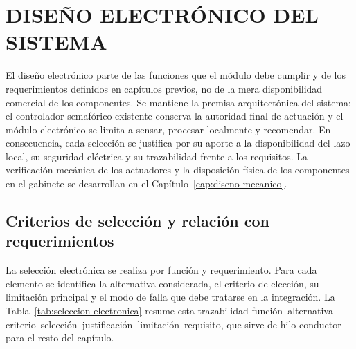 \chapter{DISEÑO ELECTRÓNICO DEL SISTEMA}\label{cap:diseno-electronico}

El diseño electrónico parte de las funciones que el módulo debe cumplir y de los requerimientos definidos
en capítulos previos, no de la mera disponibilidad comercial de los componentes. Se mantiene la premisa
arquitectónica del sistema: el controlador semafórico existente conserva la autoridad final de actuación y
el módulo electrónico se limita a sensar, procesar localmente y recomendar. En consecuencia, cada selección
se justifica por su aporte a la disponibilidad del lazo local, su seguridad eléctrica y su trazabilidad
frente a los requisitos. La verificación mecánica de los actuadores y la disposición física de los
componentes en el gabinete se desarrollan en el Capítulo~\ref{cap:diseno-mecanico}.

\section{Criterios de selección y relación con requerimientos}\label{sec:criterios-electronicos}

La selección electrónica se realiza por función y requerimiento. Para cada elemento se identifica la
alternativa considerada, el criterio de elección, su limitación principal y el modo de falla que debe
tratarse en la integración. La Tabla~\ref{tab:seleccion-electronica} resume esta trazabilidad
función--alternativa--criterio--selección--justificación--limitación--requisito, que sirve de hilo conductor
para el resto del capítulo.

